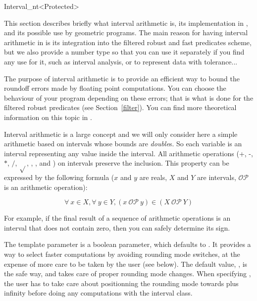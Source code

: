 
\begin{ccRefClass}{Interval_nt<Protected>}
\label{interval}


\ccDefinition

This section describes briefly what interval arithmetic is, its implementation
in {\cgal}, and its possible use by geometric programs.
The main reason for having interval arithmetic in {\cgal} is its integration
into the filtered robust and fast predicates scheme, but we also provide a
number type so that you can use it separately if you find any use for it,
such as interval analysis, or to represent data with tolerance...

The purpose of interval arithmetic is to provide an efficient way to bound
the roundoff errors made by floating point computations.
You can choose the behaviour of your program depending on these errors; that
is what is done for the filtered robust predicates (see Section~\ref{filter}).
You can find more theoretical information on this topic in
\cite{cgal:bbp-iayed-01}.

Interval arithmetic is a large concept and we will only consider here a 
simple arithmetic based on intervals whose bounds are {\it double}s.
So each variable is an interval representing any value inside the interval.
All arithmetic operations (+, -, $*$, $/$, $\sqrt{}$, ,
,  and ) on intervals preserve the inclusion.
This property can be expressed by the following formula ($x$ and $y$ are
reals, $X$ and $Y$ are intervals, $\mathcal{OP}$ is an arithmetic operation):

$$
\forall\ x \in X, \forall\ y \in Y, (x\ \mathcal{OP}\ y)
\in (X\ \mathcal{OP}\ Y)
$$

For example, if the final result of a sequence of arithmetic operations is
an interval that does not contain zero, then you can safely determine its sign.


\ccParameters

The template parameter  is a boolean parameter, which defaults
to .  It provides a way to select faster computations by avoiding
rounding mode switches, at the expense of more care to be taken by the user
(see below).  The default value, , is the safe way, and takes care of
proper rounding mode changes.  When specifying , the user has to
take care about positionning the rounding mode towards plus infinity before
doing any computations with the interval class.


\end{ccRefClass}
